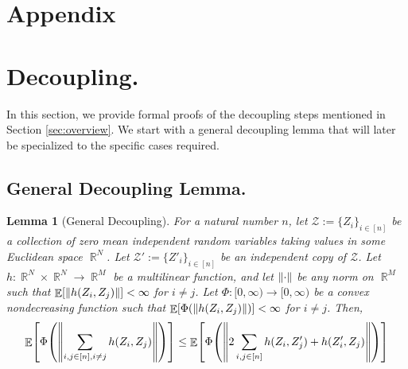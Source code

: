 \documentclass[11pt]{amsart}
\numberwithin{equation}{section}
\numberwithin{equation}{section}
\DeclareMathOperator{\E}{\mathbb{E}}
\DeclareMathOperator{\R}{\mathbb{R}}
\DeclarePairedDelimiter{\norm}{\lVert}{\rVert}
\DeclarePairedDelimiter{\paren}{(}{)}
\DeclarePairedDelimiter{\sqbr}{[}{]}
\newtheorem{lemma}[theorem]{Lemma}
\begin{document}
\printbibliography
\appendix
\section*{Appendix}
\section{Decoupling.} \label{sec:decoup}

In this section, we provide formal proofs of the decoupling steps mentioned in Section \ref{sec:overview}. We start with a general decoupling lemma that will later be specialized to the specific cases required.

\subsection{General Decoupling Lemma.}



\begin{lemma}[General Decoupling]\label{lem:masterdecoup}
    For a natural number $n$, let $ \mathcal{Z} := \{ Z_i \}_{i \in [n]}$ be a collection of zero mean independent random variables taking values in some Euclidean space $\R^N$. Let $ \mathcal{Z}' := \{ Z'_i \}_{i \in [n]}$ be an independent copy of $\mathcal{Z}$. Let $h:\R^N \times \R^N \to \R^M$ be a multilinear function, and let $\norm{ \cdot}$ be any norm on $\R^M$ such that $\E \sqbr*{\norm*{h(Z_i, Z_j)}} < \infty$ for $i \neq j$. Let $\Phi: [0, \infty) \to [0, \infty)$ be a convex nondecreasing function such that $\E \sqbr*{\Phi\paren*{\norm*{ h(Z_i, Z_j)}}} < \infty$ for $i \neq j$. Then, 
    \[ \E \sqbr*{ \Phi\paren*{\norm*{ \sum_{i,j \in [n] , i \neq j} h(Z_i, Z_j)}} } \le  \E \sqbr*{\Phi\paren*{\norm*{ 2 \sum_{i,j \in [n]} h(Z_i, Z'_j) + h(Z'_i, Z_j)}}} \]
\end{lemma}
\end{document}
